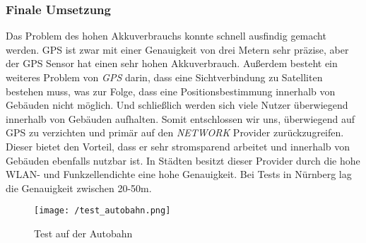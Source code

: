\subsubsection{Finale Umsetzung}
Das Problem des hohen Akkuverbrauchs konnte schnell ausfindig gemacht werden. GPS ist zwar mit einer Genauigkeit von drei Metern sehr präzise, aber der GPS Sensor hat einen sehr hohen Akkuverbrauch. Außerdem besteht ein weiteres Problem von \textit{GPS} darin, dass eine Sichtverbindung zu Satelliten bestehen muss, was zur Folge, dass eine Positionsbestimmung innerhalb von Gebäuden nicht möglich. Und schließlich werden sich viele Nutzer überwiegend innerhalb von Gebäuden aufhalten.
Somit entschlossen wir uns, überwiegend auf GPS zu verzichten und primär auf den \textit{NETWORK} Provider zurückzugreifen. Dieser bietet den Vorteil, dass er sehr stromsparend arbeitet und innerhalb von Gebäuden ebenfalls nutzbar ist. In Städten besitzt dieser Provider durch die hohe WLAN- und Funkzellendichte eine hohe Genauigkeit. Bei Tests in Nürnberg lag die Genauigkeit zwischen 20-50m.
\begin{wrapfigure}{r}{60mm}
\centering
   \texttt{[image: /test\_autobahn.png]} 
   \caption[Lokalisierung: Test auf der Autobahn]{Test auf der Autobahn}
\end{wrapfigure}
